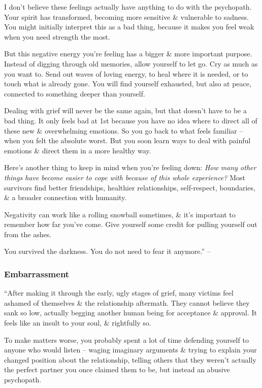 \documentclass{article}
\numberwithin{equation}{section}
\begin{document}
I don't believe these feelings actually have anything to do with the psychopath. Your spirit has transformed, becoming more sensitive \& vulnerable to sadness. You might initially interpret this as a bad thing, because it makes you feel weak when you need strength the most.

But this negative energy you're feeling has a bigger \& more important purpose. Instead of digging through old memories, allow yourself to let go. Cry as much as you want to. Send out waves of loving energy, to heal where it is needed, or to touch what is already gone. You will find yourself exhausted, but also at peace, connected to something deeper than yourself.

Dealing with grief will never be the same again, but that doesn't have to be a bad thing. It only feels bad at 1st because you have no idea where to direct all of these new \& overwhelming emotions. So you go back to what feels familiar -- when you felt the absolute worst. But you soon learn ways to deal with painful emotions \& direct them in a more healthy way.

Here's another thing to keep in mind when you're feeling down: \textit{How many other things have become easier to cope with because of this whole experience?} Most survivors find better friendships, healthier relationships, self-respect, boundaries, \& a broader connection with humanity.

Negativity can work like a rolling snowball sometimes, \& it's important to remember how far you've come. Give yourself some credit for pulling yourself out from the ashes.

You survived the darkness. You do not need to fear it anymore.'' -- \cite[pp. 131--132]{MacKenzie2015}

\subsubsection{Embarrassment}
``After making it through the early, ugly stages of grief, many victims feel ashamed of themselves \& the relationship aftermath. They cannot believe they sank so low, actually begging another human being for acceptance \& approval. It feels like an insult to your soul, \& rightfully so.

To make matters worse, you probably spent a lot of time defending yourself to anyone who would listen -- waging imaginary arguments \& trying to explain your changed position about the relationship, telling others that they weren't actually the perfect partner you once claimed them to be, but instead an abusive psychopath.
\end{document}
